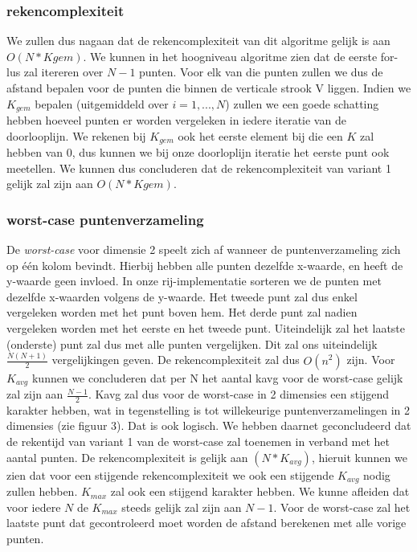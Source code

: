 \documentclass[12pt]{article}
\begin{document}
\subsubsection{rekencomplexiteit}
We zullen dus nagaan dat de rekencomplexiteit van dit algoritme gelijk is aan $O(N*Kgem)$.
We kunnen in het hoogniveau algoritme zien dat de eerste for-lus zal itereren over $N-1$ punten.
Voor elk van die punten zullen we dus de afstand bepalen voor de punten die binnen de verticale strook V liggen.
Indien we $K_{gem}$ bepalen (uitgemiddeld over $i = 1,...,N$) zullen we een goede schatting hebben hoeveel punten er worden vergeleken in iedere iteratie van de doorlooplijn.
We rekenen bij $K_{gem}$ ook het eerste element bij die een $K$ zal hebben van 0, dus kunnen we bij onze doorloplijn iteratie het eerste punt ook meetellen.
We kunnen dus concluderen dat de rekencomplexiteit van variant 1 gelijk zal zijn aan $O(N*Kgem)$.

\subsubsection{worst-case puntenverzameling}
De \textit{worst-case} voor dimensie 2 speelt zich af wanneer de puntenverzameling zich op één kolom bevindt.
Hierbij hebben alle punten dezelfde x-waarde, en heeft de y-waarde geen invloed.
In onze rij-implementatie sorteren we de punten met dezelfde x-waarden volgens de y-waarde.
Het tweede punt zal dus enkel vergeleken worden met het punt boven hem.
Het derde punt zal nadien vergeleken worden met het eerste en het tweede punt.
Uiteindelijk zal het laatste (onderste) punt zal dus met alle punten vergelijken.
Dit zal ons uiteindelijk $\frac{N(N+1)}{2}$ vergelijkingen geven. De rekencomplexiteit zal dus $O(n^2)$ zijn.
Voor $K_{avg}$ kunnen we concluderen dat per N het aantal kavg voor de worst-case gelijk zal zijn aan $\frac{N-1}{2}$.
Kavg zal dus voor de worst-case in 2 dimensies een stijgend karakter hebben, wat in tegenstelling is tot willekeurige puntenverzamelingen in 2 dimensies (zie figuur 3).
Dat is ook logisch. We hebben daarnet geconcludeerd dat de rekentijd van variant 1 van de worst-case zal toenemen in verband met het aantal punten.
De rekencomplexiteit is gelijk aan $(N*K_{avg})$, hieruit kunnen we zien dat voor een stijgende rekencomplexiteit we ook een stijgende $K_{avg}$ nodig zullen hebben.
$K_{max}$ zal ook een stijgend karakter hebben. We kunne afleiden dat voor iedere $N$ de $K_{max}$ steeds gelijk zal zijn aan $N-1$.
Voor de worst-case zal het laatste punt dat gecontroleerd moet worden de afstand berekenen met alle vorige punten.
\end{document}
